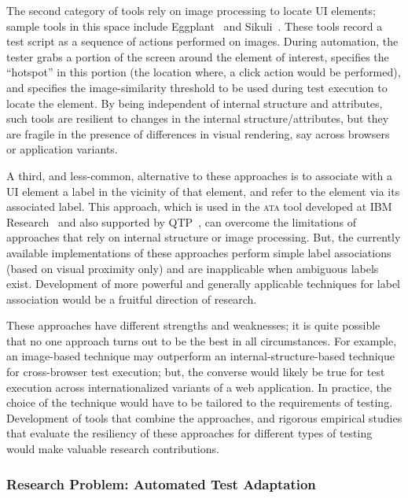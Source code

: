 The second category of tools rely on image processing to locate UI elements;
sample tools in this space include Eggplant~\cite{Eggplant} and
Sikuli~\cite{Chang:2010, Yeh:2009}. These tools record a test script as a
sequence of actions performed on images. During automation, the tester grabs a
portion of the screen around the element of interest, specifies the ``hotspot''
in this portion (the location where, \eg a click action would be performed), and
specifies the image-similarity threshold to be used during test execution to
locate the element. By being independent of internal structure and attributes,
such tools are resilient to changes in the internal structure/attributes, but
they are fragile in the presence of differences in visual rendering, say across
browsers or application variants.

A third, and less-common, alternative to these approaches is to associate with a
UI element a label in the vicinity of that element, and refer to the element via
its associated label. This approach, which is used in the \textsc{ata} tool
developed at IBM Research~\cite{thummalapenta:2012b, thummalapenta:2012a,
  thummalapenta:2013a} and also supported by QTP~\cite{hpqtp}, can overcome the
limitations of approaches that rely on internal structure or image
processing. But, the currently available implementations of these approaches
perform simple label associations (based on visual proximity only) and are
inapplicable when ambiguous labels exist. Development of more powerful and
generally applicable techniques for label association would be a fruitful
direction of research.

These approaches have different strengths and weaknesses; it is quite possible
that no one approach turns out to be the best in all circumstances. For example,
an image-based technique may outperform an internal-structure-based technique
for cross-browser test execution; but, the converse would likely be true for
test execution across internationalized variants of a web application. In
practice, the choice of the technique would have to be tailored to the
requirements of testing.  Development of tools that combine the approaches, and
rigorous empirical studies that evaluate the resiliency of these approaches for
different types of testing would make valuable research contributions.


\subsubsection*{Research Problem: Automated Test Adaptation}

